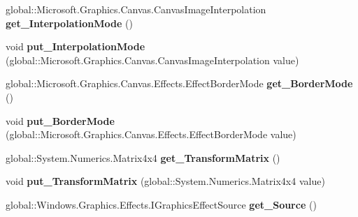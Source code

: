 \begin{DoxyCompactItemize}
global\+::\+Microsoft.\+Graphics.\+Canvas.\+Canvas\+Image\+Interpolation {\bfseries get\+\_\+\+Interpolation\+Mode} ()
\item 
\mbox{\label{class_microsoft_1_1_graphics_1_1_canvas_1_1_effects_1_1_transform3_d_effect_a38d32bf836b68f42f30afd88937f6280}} 
void {\bfseries put\+\_\+\+Interpolation\+Mode} (global\+::\+Microsoft.\+Graphics.\+Canvas.\+Canvas\+Image\+Interpolation value)
\item 
\mbox{\label{class_microsoft_1_1_graphics_1_1_canvas_1_1_effects_1_1_transform3_d_effect_ad947ca8fd0e8f553756452097191b3e9}} 
global\+::\+Microsoft.\+Graphics.\+Canvas.\+Effects.\+Effect\+Border\+Mode {\bfseries get\+\_\+\+Border\+Mode} ()
\item 
\mbox{\label{class_microsoft_1_1_graphics_1_1_canvas_1_1_effects_1_1_transform3_d_effect_a8f41e3d39b88ba94f977519171bf2446}} 
void {\bfseries put\+\_\+\+Border\+Mode} (global\+::\+Microsoft.\+Graphics.\+Canvas.\+Effects.\+Effect\+Border\+Mode value)
\item 
\mbox{\label{class_microsoft_1_1_graphics_1_1_canvas_1_1_effects_1_1_transform3_d_effect_aa80b16ff5d14dca3bcbf428286d5496c}} 
global\+::\+System.\+Numerics.\+Matrix4x4 {\bfseries get\+\_\+\+Transform\+Matrix} ()
\item 
\mbox{\label{class_microsoft_1_1_graphics_1_1_canvas_1_1_effects_1_1_transform3_d_effect_a1a29836c35514b1d6cf8834255c05da7}} 
void {\bfseries put\+\_\+\+Transform\+Matrix} (global\+::\+System.\+Numerics.\+Matrix4x4 value)
\item 
\mbox{\label{class_microsoft_1_1_graphics_1_1_canvas_1_1_effects_1_1_transform3_d_effect_aabf75189a0a2858c19e9e0c431ee3e81}} 
global\+::\+Windows.\+Graphics.\+Effects.\+I\+Graphics\+Effect\+Source {\bfseries get\+\_\+\+Source} ()
\item 
\mbox{\label{class_microsoft_1_1_graphics_1_1_canvas_1_1_effects_1_1_transform3_d_effect_a50774a6e92f54c773522cbc57e44ffbf}} 

\end{DoxyCompactItemize}
